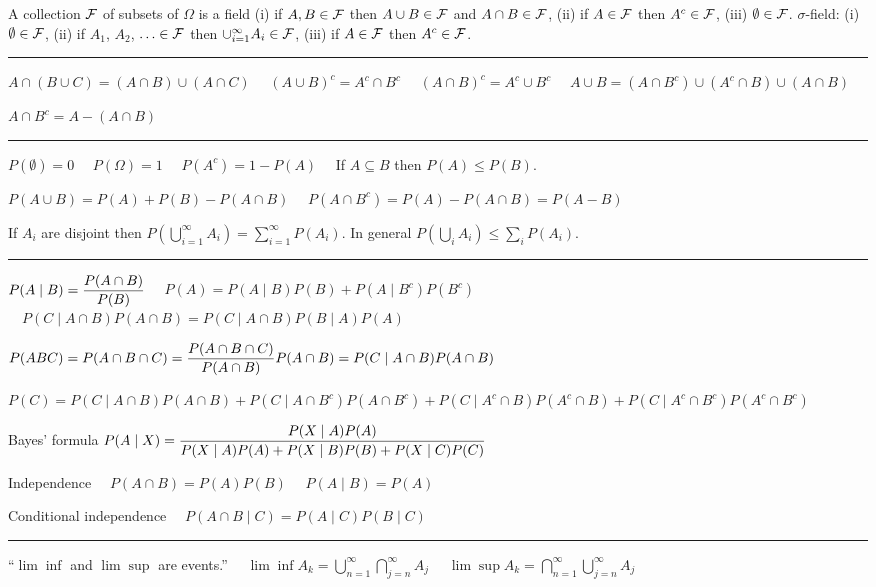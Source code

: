 \nopagenumbers
\parindent=0pt
\vsize=10in
\hsize=7.5in
\hoffset=-0.5in
\voffset=-0.5in

A collection $\cal F$ of subsets of $\Omega$ is a field
(i) if $A,B\in\cal F$ then $A\cup B\in\cal F$ and $A\cap B\in\cal F$,
(ii) if $A\in\cal F$ then $A^c\in\cal F$,
(iii) $\emptyset\in\cal F$.
$\sigma$-field:
(i) $\emptyset\in\cal F$,
(ii) if $A_1$, $A_2$, $\ldots\in\cal F$ then
$\cup_{i=1}^\infty A_i\in\cal F$,
(iii) if $A\in\cal F$ then $A^c\in\cal F$.

\smallskip
\hrule

\smallskip
$A\cap(B\cup C)=(A\cap B)\cup(A\cap C)$
$\quad(A\cup B)^c=A^c\cap B^c$
$\quad(A\cap B)^c=A^c\cup B^c$
$\quad A\cup B=(A\cap B^c)\cup(A^c\cap B)\cup(A\cap B)$

\smallskip
$A\cap B^c=A-(A\cap B)$

\smallskip
\hrule

\smallskip
$P(\emptyset)=0$
$\quad P(\Omega)=1$
$\quad P(A^c)=1-P(A)\quad$
If $A\subseteq B$ then $P(A)\le P(B)$.

\smallskip
$P(A\cup B)=P(A)+P(B)-P(A\cap B)$
$\quad P(A\cap B^c)=P(A)-P(A\cap B)=P(A-B)$

\smallskip
If $A_i$ are disjoint then
$\displaystyle P\left(\bigcup_{i=1}^\infty A_i\right)
=\sum_{i=1}^\infty P(A_i)$.
In general
$\displaystyle P\left(\bigcup_i A_i\right)\le\sum_i P(A_i)$.

\smallskip
\hrule

\smallskip
$\displaystyle P(A\mid B)={P(A\cap B)\over P(B)}$
$\quad P(A)=P(A\mid B)P(B)+P(A\mid B^c)P(B^c)$
$\quad P(C\mid A\cap B)P(A\cap B)=P(C\mid A\cap B)P(B\mid A)P(A)$

\smallskip
$\displaystyle P(ABC)=P(A\cap B\cap C)
={P(A\cap B\cap C)\over P(A\cap B)}P(A\cap B)
=P(C\mid A\cap B)P(A\cap B)$

\smallskip
$P(C)=P(C\mid A\cap B)P(A\cap B)
+P(C\mid A\cap B^c)P(A\cap B^c)
+P(C\mid A^c\cap B)P(A^c\cap B)
+P(C\mid A^c\cap B^c)P(A^c\cap B^c)$

\smallskip
Bayes' formula
$\displaystyle P(A\mid X)={P(X\mid A)P(A)\over
P(X\mid A)P(A)+P(X\mid B)P(B)+P(X\mid C)P(C)}$

\smallskip
Independence
$\quad P(A\cap B)=P(A)P(B)$
$\quad P(A\mid B)=P(A)$

\smallskip
Conditional independence
$\quad P(A\cap B\mid C)=P(A\mid C)P(B\mid C)$

\smallskip
\hrule

\smallskip
``$\lim\inf$ and $\lim\sup$ are events.''
$\quad\displaystyle\lim\inf A_k
=\bigcup_{n=1}^\infty\bigcap_{j=n}^\infty A_j$
$\quad\displaystyle\lim\sup A_k
=\bigcap_{n=1}^\infty\bigcup_{j=n}^\infty A_j$

